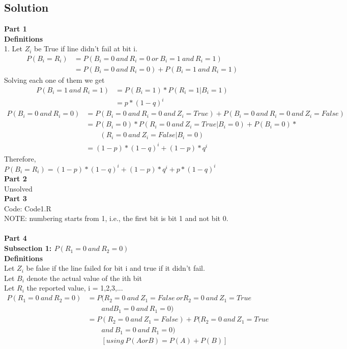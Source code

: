 \documentclass[12pt]{article}
\begin{document}
\subsection*{Solution}
\textbf{Part 1}\\
\textbf{Definitions}\\
1. Let $Z_i$ be True if line didn't fail at bit i.
\begin{align}
P(B_i = R_i) & = P(B_i = 0\ and\ R_i = 0\ or\ B_i = 1\ and\ R_i = 1) \nonumber \\
& = P(B_i = 0\ and\ R_i = 0) + P(B_i = 1\ and\ R_i = 1) \nonumber 
\end{align}
Solving each one of them we get \\
\begin{align}
P(B_i = 1\ and\ R_i = 1)&  = P(B_i = 1) * P(R_i = 1 | B_i = 1) \nonumber \\
& = p * (1-q)^i \nonumber
\end{align}
\begin{align}
P(B_i = 0\ and\ R_i = 0)&  = P(B_i = 0\ and\ R_i = 0\ and\ Z_i = True) + P(B_i = 0\ and\ R_i = 0\ and\ Z_i = False)   \nonumber \\
& = P(B_i = 0) * P(R_i = 0\ and \ Z_i = True | B_i = 0) + P(B_i = 0) * \nonumber \\
& \qquad (R_i = 0\ and \ Z_i = False | B_i = 0) \nonumber \\
& = (1-p)*(1-q)^i + (1-p)*q^i \nonumber
\end{align}
Therefore, \\
$P(B_i = R_i) = (1-p)*(1-q)^i + (1-p)*q^i +  p * (1-q)^i $  \\ 
\textbf{Part 2}\\
Unsolved\\
\textbf{Part 3}\\
Code: Code1.R\\
NOTE: numbering starts from 1, i.e., the first bit is bit 1 and not bit 0.\\\\
\textbf{Part 4 }\\
\textbf{Subsection 1: $P(R_1 = 0\ and\ R_2 = 0)$ }\\
\textbf{Definitions}\\
Let $Z_i$ be false if the line failed for bit i and true if it didn't fail.\\
Let $B_i$ denote the actual value of the ith bit \\
Let  $R_i$ the reported value, i = 1,2,3,...
\begin{align}
P(R_1 = 0\ and\ R_2 = 0)  & = P(R_2 = 0\ and\ Z_1 = False\ or R_2 = 0\ and\ Z_1 = True \nonumber \\
 & \qquad and  B_1 = 0\ and\ R_1 = 0)\ \nonumber \\
 & = P(R_2 = 0\ and\ Z_1 = False) + P(R_2 = 0\ and\ Z_1 = True\ \nonumber \\
 & \qquad and\  B_1 = 0\ and\ R_1 = 0)\ \nonumber \\
 & \qquad [using\ P(A or B) = P(A) + P(B)]\ \nonumber
\end{align}
\end{document}
